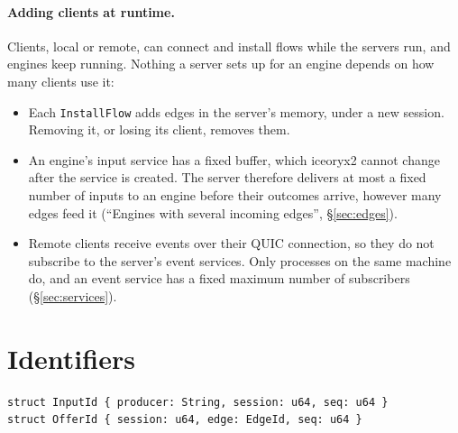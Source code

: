 \documentclass[11pt]{article}
\newcommand{\code}[1]{\texttt{#1}}
\begin{document}
\paragraph{Adding clients at runtime.} Clients, local or remote, can connect
and install flows while the servers run, and engines keep running. Nothing a
server sets up for an engine depends on how many clients use it:
\begin{itemize}[nosep]
  \item Each \code{InstallFlow} adds edges in the server's memory, under a new
        session. Removing it, or losing its client, removes them.
  \item An engine's input service has a fixed buffer, which iceoryx2 cannot
        change after the service is created. The server therefore delivers
        at most a fixed number of inputs to an engine before their outcomes
        arrive, however many edges feed it
        (``Engines with several incoming edges'', \S\ref{sec:edges}).
  \item Remote clients receive events over their QUIC connection, so they do
        not subscribe to the server's event services. Only processes on the
        same machine do, and an event service has a fixed maximum number of
        subscribers (\S\ref{sec:services}).
\end{itemize}

\section{Identifiers}
\label{sec:ids}

\begin{lstlisting}
struct InputId { producer: String, session: u64, seq: u64 }
struct OfferId { session: u64, edge: EdgeId, seq: u64 }
\end{lstlisting}
\end{document}
